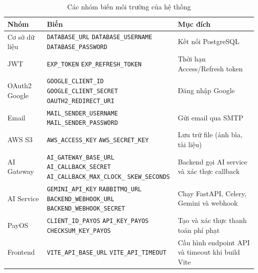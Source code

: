\begin{table}[h]
\centering
\small
\caption{Các nhóm biến môi trường của hệ thống}
\label{tab:env_vars}
\begin{tabularx}{\textwidth}{|p{2.8cm}|p{6.3cm}|X|}
\hline
\textbf{Nhóm} & \textbf{Biến} & \textbf{Mục đích} \\
\hline
Cơ sở dữ liệu
  & \texttt{DATABASE\_URL} \newline
    \texttt{DATABASE\_USERNAME} \newline
    \texttt{DATABASE\_PASSWORD}
  & Kết nối PostgreSQL \\
\hline
JWT
  & \texttt{EXP\_TOKEN} \newline
    \texttt{EXP\_REFRESH\_TOKEN}
  & Thời hạn Access/Refresh token \\
\hline
OAuth2 Google
  & \texttt{GOOGLE\_CLIENT\_ID} \newline
    \texttt{GOOGLE\_CLIENT\_SECRET} \newline
    \texttt{OAUTH2\_REDIRECT\_URI}
  & Đăng nhập Google \\
\hline
Email
  & \texttt{MAIL\_SENDER\_USERNAME} \newline
    \texttt{MAIL\_SENDER\_PASSWORD}
  & Gửi email qua SMTP \\
\hline
AWS S3
  & \texttt{AWS\_ACCESS\_KEY} \newline
    \texttt{AWS\_SECRET\_KEY}
  & Lưu trữ file (ảnh bìa, tài liệu) \\
\hline
AI Gateway
  & \texttt{AI\_GATEWAY\_BASE\_URL} \newline
    \texttt{AI\_CALLBACK\_SECRET} \newline
    \texttt{AI\_CALLBACK\_MAX\_CLOCK\_} \newline
    \texttt{SKEW\_SECONDS}
  & Backend gọi AI service và xác thực callback \\
\hline
AI Service
  & \texttt{GEMINI\_API\_KEY} \newline
    \texttt{RABBITMQ\_URL} \newline
    \texttt{BACKEND\_WEBHOOK\_URL} \newline
    \texttt{BACKEND\_WEBHOOK\_SECRET}
  & Chạy FastAPI, Celery, Gemini và webhook \\
\hline
PayOS
  & \texttt{CLIENT\_ID\_PAYOS} \newline
    \texttt{API\_KEY\_PAYOS} \newline
    \texttt{CHECKSUM\_KEY\_PAYOS}
  & Tạo và xác thực thanh toán phí phạt \\
\hline
Frontend
  & \texttt{VITE\_API\_BASE\_URL} \newline
    \texttt{VITE\_API\_TIMEOUT}
  & Cấu hình endpoint API và timeout khi build Vite \\
\hline
\end{tabularx}
\end{table}

